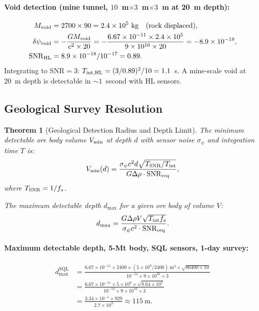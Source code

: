 \documentclass[aps,prd,twocolumn,superscriptaddress,nofootinbib]{revtex4-2}
\newcommand{\SQL}{\mathrm{SQL}}
\newcommand{\HL}{\mathrm{HL}}
\newtheorem{theorem}{Theorem}
\begin{document}
\paragraph{Void detection (mine tunnel, $10$~m$\times 3$~m$\times 3$~m
at 20~m depth):}
\begin{align}
  M_{\rm void} &= 2700 \times 90 = 2.4\times10^5~\mathrm{kg}
  \quad (\text{rock displaced}), \\
  \delta\psi_{\rm void} &= -\frac{G M_{\rm void}}{c^2 \times 20}
  = -\frac{6.67\times10^{-11}\times2.4\times10^5}
  {9\times10^{16}\times20}
  = -8.9\times10^{-18}, \\
  \mathrm{SNR}_{\HL} &= 8.9\times10^{-18}/10^{-17} = 0.89.
\end{align}
Integrating to SNR$=3$: $T_{\rm int,HL} = (3/0.89)^2/10 = 1.1$~s.
A mine-scale void at 20~m depth is detectable in $\sim 1$~second with
HL sensors.

\subsection{Geological Survey Resolution}

\begin{theorem}[Geological Detection Radius and Depth Limit]
\label{thm:geo-resolution}
The minimum detectable ore body volume $V_{\rm min}$ at depth $d$
with sensor noise $\sigma_\psi$ and integration time $T$ is:
\begin{equation}
  V_{\rm min}(d) = \frac{\sigma_\psi c^2 d \sqrt{T_{\rm SNR}/T_{\rm int}}}
  {G\Delta\rho \cdot \mathrm{SNR}_{\rm req}},
  \label{eq:vmin-geology}
\end{equation}
where $T_{\rm SNR} = 1/f_s$.

The maximum detectable depth $d_{\max}$ for a given ore body of
volume $V$:
\begin{equation}
  d_{\max} = \frac{G\Delta\rho V \sqrt{T_{\rm int} f_s}}
  {\sigma_\psi c^2 \cdot \mathrm{SNR}_{\rm req}}.
  \label{eq:dmax}
\end{equation}
\end{theorem}

\paragraph{Maximum detectable depth, 5-Mt body, SQL sensors, 1-day survey:}
\begin{align}
  d_{\max}^{\SQL} &= \frac{6.67\times10^{-11}\times2400
  \times(5\times10^9/2400)~\mathrm{m}^3\times\sqrt{86400\times10}}
  {10^{-14}\times9\times10^{16}\times3} \nonumber\\
  &= \frac{6.67\times10^{-11}\times5\times10^9\times\sqrt{8.64\times10^5}}
  {10^{-14}\times9\times10^{16}\times3} \nonumber\\
  &= \frac{3.34\times10^{-1}\times929}
  {2.7\times10^3} \approx 115~\mathrm{m}.
\end{align}
\end{document}
